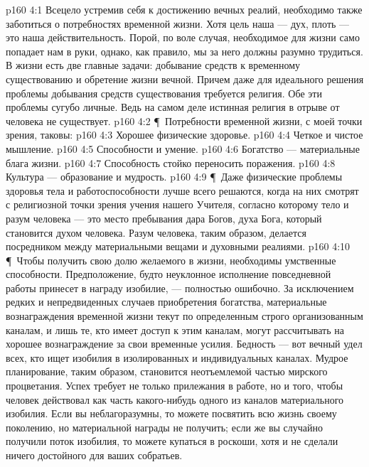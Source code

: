 \vs p160 4:1 Всецело устремив себя к достижению вечных реалий, необходимо также заботиться о потребностях временной жизни. Хотя цель наша --- дух, плоть --- это наша действительность. Порой, по воле случая, необходимое для жизни само попадает нам в руки, однако, как правило, мы за него должны разумно трудиться. В жизни есть две главные задачи: добывание средств к временному существованию и обретение жизни вечной. Причем даже для идеального решения проблемы добывания средств существования требуется религия. Обе эти проблемы сугубо личные. Ведь на самом деле истинная религия в отрыве от человека не существует.
\vs p160 4:2 \P\ Потребности временной жизни, с моей точки зрения, таковы:
\vs p160 4:3 \bibnobreakspace Хорошее физические здоровье.
\vs p160 4:4 \bibnobreakspace Четкое и чистое мышление.
\vs p160 4:5 \bibnobreakspace Способности и умение.
\vs p160 4:6 \bibnobreakspace Богатство --- материальные блага жизни.
\vs p160 4:7 \bibnobreakspace Способность стойко переносить поражения.
\vs p160 4:8 \bibnobreakspace Культура --- образование и мудрость.
\vs p160 4:9 \P\ Даже физические проблемы здоровья тела и работоспособности лучше всего решаются, когда на них смотрят с религиозной точки зрения учения нашего Учителя, согласно которому тело и разум человека --- это место пребывания дара Богов, духа Бога, который становится духом человека. Разум человека, таким образом, делается посредником между материальными вещами и духовными реалиями.
\vs p160 4:10 \P\ Чтобы получить свою долю желаемого в жизни, необходимы умственные способности. Предположение, будто неуклонное исполнение повседневной работы принесет в награду изобилие, --- полностью ошибочно. За исключением редких и непредвиденных случаев приобретения богатства, материальные вознаграждения временной жизни текут по определенным строго организованным каналам, и лишь те, кто имеет доступ к этим каналам, могут рассчитывать на хорошее вознаграждение за свои временные усилия. Бедность --- вот вечный удел всех, кто ищет изобилия в изолированных и индивидуальных каналах. Мудрое планирование, таким образом, становится неотъемлемой частью мирского процветания. Успех требует не только прилежания в работе, но и того, чтобы человек действовал как часть какого\hyp{}нибудь одного из каналов материального изобилия. Если вы неблагоразумны, то можете посвятить всю жизнь своему поколению, но материальной награды не получить; если же вы случайно получили поток изобилия, то можете купаться в роскоши, хотя и не сделали ничего достойного для ваших собратьев.
